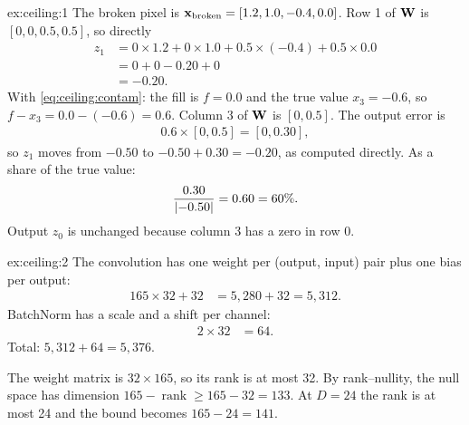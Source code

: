 
\begin{solution}{ex:ceiling:1}
The broken pixel is $\mathbf{x}_{\text{broken}} = [1.2, 1.0, -0.4, 0.0]$. Row 1 of $\mathbf{W}$ is $[0, 0, 0.5, 0.5]$, so directly
\begin{align*}
  z_1 &= 0\times1.2 + 0\times1.0 + 0.5\times(-0.4) + 0.5\times0.0\\
      &= 0 + 0 - 0.20 + 0\\
      &= -0.20 .
\end{align*}
With \cref{eq:ceiling:contam}: the fill is $f = 0.0$ and the true value $x_3 = -0.6$, so $f - x_3 = 0.0 - (-0.6) = 0.6$. Column 3 of $\mathbf{W}$ is $[0, 0.5]$. The output error is
\begin{align*}
  0.6\times[0, 0.5] = [0, 0.30],
\end{align*}
so $z_1$ moves from $-0.50$ to $-0.50 + 0.30 = -0.20$, as computed directly. As a share of the true value:
\begin{align*}
  \frac{0.30}{\left\lvert -0.50 \right\rvert} = 0.60 = 60\% .
\end{align*}
Output $z_0$ is unchanged because column 3 has a zero in row 0.
\end{solution}

\begin{solution}{ex:ceiling:2}
The convolution has one weight per (output, input) pair plus one bias per output:
\begin{align*}
  165\times32 + 32 &= 5{,}280 + 32 = 5{,}312 .
\end{align*}
BatchNorm has a scale and a shift per channel:
\begin{align*}
  2\times32 &= 64 .
\end{align*}
Total: $5{,}312 + 64 = 5{,}376$.

The weight matrix is $32\times165$, so its rank is at most 32. By rank--nullity, the null space has dimension $165 - \operatorname{rank} \geq 165 - 32 = 133$. At $D = 24$ the rank is at most 24 and the bound becomes $165 - 24 = 141$.
\end{solution}

